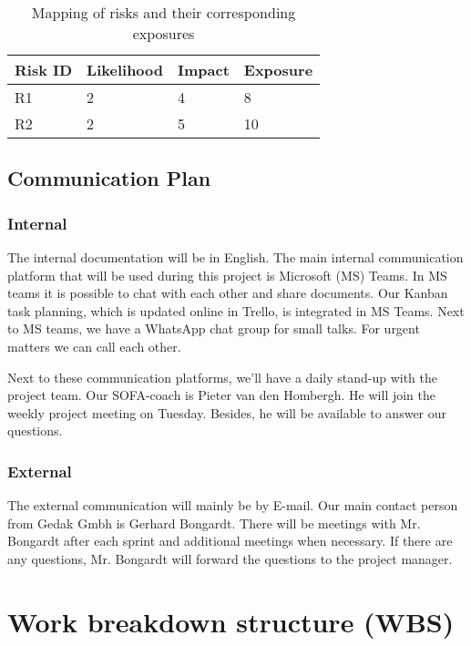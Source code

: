 \begin{table}[htp]
    \caption{Mapping of risks and their corresponding exposures}
    \center
    \begin{tabular}{@{}|l|l|l|l|@{}}
        \toprule
        \textbf{Risk ID} & \textbf{Likelihood} & \textbf{Impact} & \textbf{Exposure} \\
        \hline
        R1      & 2          & 4      & 8        \\
        R2      & 2          & 5      & 10 \\
        \hline
    \end{tabular}\label{tab:table4}
\end{table}

\subsection{Communication Plan}

\subsubsection{Internal}

The internal documentation will be in English.
The main internal communication platform that will be used during this project is Microsoft (MS) Teams.
In MS teams it is possible to chat with each other and share documents.
Our Kanban task planning, which is updated online in Trello, is integrated in MS Teams.
Next to MS teams, we have a WhatsApp chat group for small talks.
For urgent matters we can call each other.


Next to these communication platforms, we’ll have a daily stand-up with the project team.
Our SOFA-coach is Pieter van den Hombergh.
He will join the weekly project meeting on Tuesday.
Besides, he will be available to answer our questions.

\subsubsection{External}

The external communication will mainly be by E-mail.
Our main contact person from Gedak Gmbh is Gerhard Bongardt.
There will be meetings with Mr. Bongardt after each sprint and additional meetings when necessary.
If there are any questions, Mr. Bongardt will forward the questions to the project manager.

\section{Work breakdown structure (WBS)}\label{sec:work-breakdown-structure-(wbs)}


